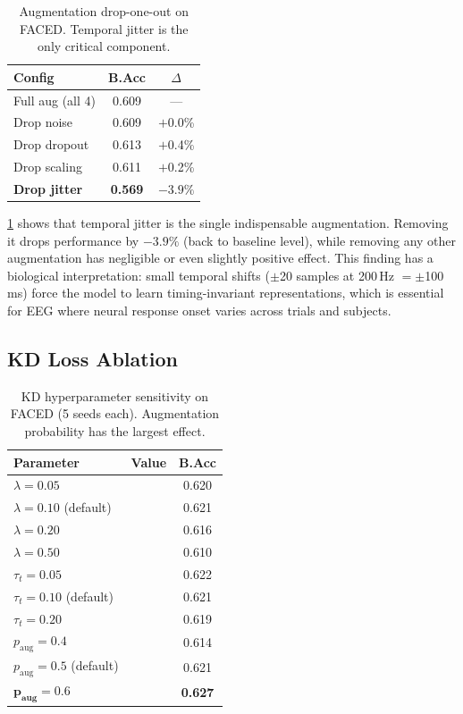 \begin{table}%
  \centering
  \vspace{-5mm}
  \caption{Augmentation drop-one-out on FACED. Temporal jitter is the only critical component.}
  \small
  \begin{tabular}{lcc}
  \toprule
  Config & B.Acc & $\Delta$ \\
  \midrule
  Full aug (all 4) & 0.609 & --- \\
  Drop noise & 0.609 & $+$0.0\% \\
  Drop dropout & 0.613 & $+$0.4\% \\
  Drop scaling & 0.611 & $+$0.2\% \\
  \textbf{Drop jitter} & \textbf{0.569} & $\mathbf{-3.9\%}$ \\
  \bottomrule
  \end{tabular}
  \label{tab:aug_ablation}
\end{table}

\cref{tab:aug_ablation} shows that temporal jitter is the single indispensable augmentation. Removing it drops performance by $-3.9\%$ (back to baseline level), while removing any other augmentation has negligible or even slightly positive effect. This finding has a biological interpretation: small temporal shifts ($\pm$20 samples at 200\,Hz $= \pm$100\,ms) force the model to learn timing-invariant representations, which is essential for EEG where neural response onset varies across trials and subjects.

\subsection{KD Loss Ablation}
\label{sec:kd_ablation}
\vspace{-1mm}

\begin{table}
  \centering
  \vspace{-5mm}
  \caption{KD hyperparameter sensitivity on FACED (5 seeds each). Augmentation probability has the largest effect.}
  \small
  \begin{tabular}{lcc}
  \toprule
  Parameter & Value & B.Acc \\
  \midrule
  $\lambda = 0.05$ & & 0.620 \\
  $\lambda = 0.10$ (default) & & 0.621 \\
  $\lambda = 0.20$ & & 0.616 \\
  $\lambda = 0.50$ & & 0.610 \\
  \midrule
  $\tau_t = 0.05$ & & 0.622 \\
  $\tau_t = 0.10$ (default) & & 0.621 \\
  $\tau_t = 0.20$ & & 0.619 \\
  \midrule
  $p_{\text{aug}} = 0.4$ & & 0.614 \\
  $p_{\text{aug}} = 0.5$ (default) & & 0.621 \\
  $\mathbf{p_{\text{aug}} = 0.6}$ & & \textbf{0.627} \\
  \bottomrule
  \end{tabular}
  \label{tab:kd_ablation}
\end{table}

